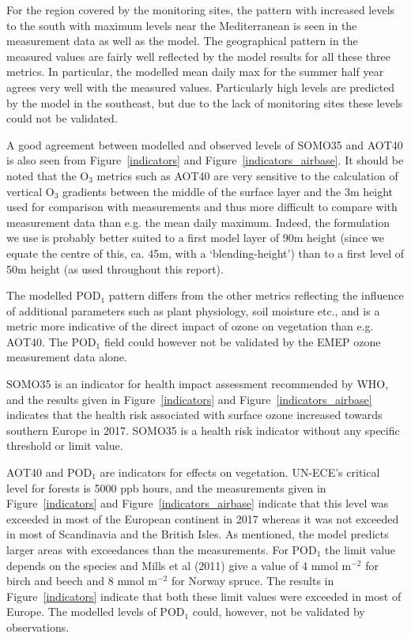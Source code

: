 For the region covered by the monitoring sites, the pattern with increased levels to the south with maximum levels near the Mediterranean is seen in the measurement data as well as the model. The geographical pattern in the measured values are fairly well reflected by the model results for all these three metrics. In particular, the modelled mean daily max for the summer half year agrees very well with the measured values. Particularly high levels are predicted by the model in the southeast, but due to the lack of monitoring sites these levels could not be validated. 

\clearpage


A good agreement between modelled and observed levels of SOMO35 and AOT40 is also seen from Figure~\ref{indicators} and Figure~\ref{indicators_airbase}. It should be noted that the O$_3$ metrics such as AOT40 are very sensitive to the calculation of vertical O$_3$ gradients between the middle of the surface layer and the 3m height used for comparison with measurements \citep{Tuovinen:EP2007} and thus more difficult to compare with measurement data than e.g. the mean daily maximum. Indeed, the formulation we use \citep{Simpson_et_al:EMEP} is probably better suited to a first model layer of 90m height (since we equate the centre of this, ca. 45m, with a `blending-height') than to a first level of 50m height (as used throughout this report). 

The modelled POD$_1$ pattern differs from the other metrics reflecting the influence of additional parameters such as plant physiology, soil moisture etc., and is a metric more indicative of the direct impact of ozone on vegetation than e.g. AOT40. The POD$_1$ field could however not be validated by the EMEP ozone measurement data alone. 

SOMO35 is an indicator for health impact assessment recommended by WHO, and the results given in Figure~\ref{indicators} and Figure~\ref{indicators_airbase} indicates that the health risk associated with surface ozone increased towards southern Europe in 2017. SOMO35 is a health risk indicator without any specific threshold or limit value.

AOT40 and POD$_1$ are indicators for effects on vegetation. UN-ECE's critical level for forests is 5000 ppb hours, and the measurements given in Figure~\ref{indicators} and Figure~\ref{indicators_airbase} indicate that this level was exceeded in most of the European continent in 2017 whereas it was not exceeded in most of Scandinavia and the British Isles. As mentioned, the model predicts larger areas with exceedances than the measurements. For POD$_1$ the limit value depends on the species and Mills et al (2011) give a value of 4 mmol m$^{-2}$ for birch and beech and 8 mmol m$^{-2}$ for Norway spruce. The results in Figure~\ref{indicators} indicate that both these limit values were exceeded in most of Europe. The modelled levels of POD$_1$ could, however, not be validated by observations. 

